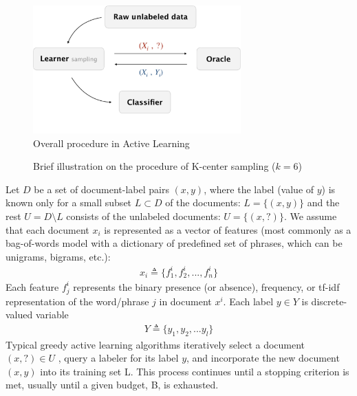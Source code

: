 \documentclass{acmtog}
\begin{document}
\begin{figure}[t]
\includegraphics[width=8cm]{procedure}
\centering
\caption{Overall procedure in Active Learning}
  \label{fig:procedure}
\end{figure}
\begin{figure}
\centering
{}
\caption{Brief illustration on the procedure of K-center sampling ($k=6$)}
\label{fig:kmeans}
\end{figure}

Let $D$ be a set of document-label pairs $(x,y)$, where the label (value of $y$) is known only for a small subset $L \subset D$ of the documents: $L = \{(x,y)\}$ and the rest $U=D \setminus L$ consists of the unlabeled documents: $U = \{(x, ?)\}$. We assume that each document $x_i$ is represented as a vector of features (most commonly as a bag-of-words model with a dictionary of predefined set of phrases, which can be unigrams, bigrams, etc.): 
\begin{eqnarray}
x_i \triangleq \{f_1^i,f_2^i,...,f_n^i\}
\end{eqnarray}
Each feature $f_j^i$ represents the binary presence (or absence), frequency, or tf-idf representation of the word/phrase $j$ in document $x^i$. Each label $y \in Y$ is discrete-valued variable 
\begin{eqnarray}
Y \triangleq \{y_1,y_2,...y_l\}
\end{eqnarray}
Typical greedy active learning algorithms iteratively select a document $(x, ?) \in  U$ , query a labeler for its label $y$, and incorporate the new document $(x, y)$ into its training set L. This process continues until a stopping criterion is met, usually until a given budget, B, is exhausted.
\end{document}
